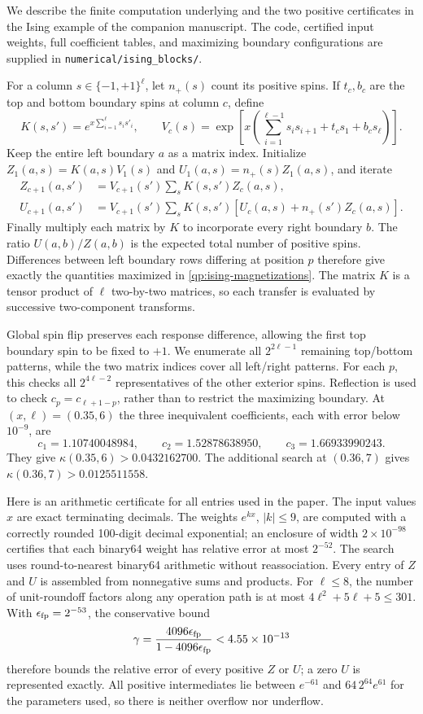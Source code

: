 \documentclass[11pt,a4paper]{article}
\theoremstyle{remark}
\begin{document}
We describe the finite computation underlying 
and the two positive certificates in the Ising example of the companion manuscript.
The code, certified input weights, full coefficient tables, and
maximizing boundary configurations are supplied in
\texttt{numerical/ising\_blocks/}.

For a column $s\in\{-1,+1\}^{\ell}$, let $n_+(s)$ count its positive
spins. If $t_c,b_c$ are the top and bottom boundary spins at column
$c$, define
\[
 K(s,s')=e^{x\sum_{i=1}^{\ell}s_is'_i},\qquad
 V_c(s)=\exp\!\left[x\left(\sum_{i=1}^{\ell-1}s_is_{i+1}
                         +t_cs_1+b_cs_\ell\right)\right].
\]
Keep the entire left boundary $a$ as a matrix index. Initialize
$Z_1(a,s)=K(a,s)V_1(s)$ and $U_1(a,s)=n_+(s)Z_1(a,s)$, and iterate
\begin{align*}
 Z_{c+1}(a,s')&=V_{c+1}(s')\sum_sK(s,s')Z_c(a,s),\\
 U_{c+1}(a,s')&=V_{c+1}(s')\sum_sK(s,s')
                     [U_c(a,s)+n_+(s')Z_c(a,s)].
\end{align*}
Finally multiply each matrix by $K$ to incorporate every right
boundary $b$. The ratio $U(a,b)/Z(a,b)$ is the expected total number
of positive spins. Differences between left boundary rows differing
at position $p$ therefore give exactly the quantities maximized in
\eqref{qp:ising-magnetizations}. The matrix $K$ is a tensor product
of $\ell$ two-by-two matrices, so each transfer is evaluated by
successive two-component transforms.

Global spin flip preserves each response difference, allowing the
first top boundary spin to be fixed to $+1$. We enumerate all
$2^{2\ell-1}$ remaining top/bottom patterns, while the two matrix
indices cover all left/right patterns. For each $p$, this checks
all $2^{4\ell-2}$ representatives of the other exterior spins.
Reflection is used to check $c_p=c_{\ell+1-p}$, rather than to
restrict the maximizing boundary. At $(x,\ell)=(0.35,6)$ the three
inequivalent coefficients, each with error below $10^{-9}$, are
\[
 c_1=1.10740048984,\qquad c_2=1.52878638950,\qquad
 c_3=1.66933990243.
\]
They give $\kappa(0.35,6)>0.0432162700$.
The additional search at $(0.36,7)$ gives
$\kappa(0.36,7)>0.0125511558$.

Here is an arithmetic certificate for all entries used in the paper.
The input values $x$ are exact terminating decimals. The weights
$e^{kx}$, $|k|\le9$, are computed with a correctly rounded
100-digit decimal exponential; an enclosure of width $2\times10^{-98}$
certifies that each binary64 weight has relative error at most
$2^{-52}$. The search uses round-to-nearest binary64 arithmetic
without reassociation. Every entry of $Z$ and $U$ is assembled from
nonnegative sums and products. For $\ell\le8$, the number of
unit-roundoff factors along any operation path is at most
$4\ell^2+5\ell+5\le301$. With $\epsilon_{\rm fp}=2^{-53}$, the
conservative bound
\[
 \gamma=\frac{4096\epsilon_{\rm fp}}{1-4096\epsilon_{\rm fp}}
 <4.55\times10^{-13}
\]
therefore bounds the relative error of every positive $Z$ or $U$;
a zero $U$ is represented exactly. All positive intermediates lie
between $e^{-61}$ and $64\,2^{64}e^{61}$ for the parameters used,
so there is neither overflow nor underflow.
\end{document}
